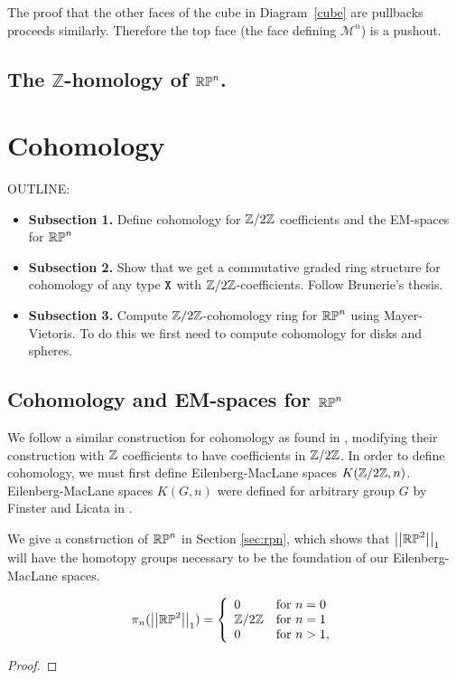 \documentclass{amsart}
\begin{document}
The proof that the other faces of the cube in Diagram~\ref{cube} are pullbacks proceeds similarly. Therefore the top face (the face defining $\mathcal{M}^n$) is a pushout. 



\subsection{The $\mathbb{Z}$-homology of $\mathbb{RP}^n$.}


\section{Cohomology}
\label{sec:cohom}

OUTLINE:
\begin{itemize}
\item 
  \textbf{Subsection 1.} 
  Define cohomology for $ \mathbb{Z}/2\mathbb{Z} $ coefficients and the
  EM-spaces for $ \mathbb{RP}^n $ 
\item
  \textbf{Subsection 2.} Show that we get a commutative
  graded ring structure for cohomology of any type $ \mathtt{X} $
  with $ \mathbb{Z}/2\mathbb{Z} $-coefficients. Follow Brunerie's thesis.
\item
  \textbf{Subsection 3.} Compute $ \mathbb{Z}/2\mathbb{Z} $-cohomology ring
  for $ \mathbb{RP}^n $ using Mayer-Vietoris.  To do this we 
  first need to compute cohomology for disks and spheres.  
\end{itemize}


\subsection{Cohomology and EM-spaces for $\mathbb{RP}^n$}


We follow a similar construction for cohomology as found in \cite{brunerie:thesis}, modifying their construction with $\mathbb{Z}$ coefficients to have coefficients in $\mathbb{Z}/2\mathbb{Z}$. In order to define cohomology, we must first define Eilenberg-MacLane spaces $K(\mathbb{Z}/2\mathbb{Z},n)$. Eilenberg-MacLane spaces $K(G,n)$ were defined for arbitrary group $G$ by Finster and Licata in \cite{fl:em}.

We give a construction of $\mathbb{RP}^n$ in Section \ref{sec:rpn}, which shows that $\left| \left| \mathbb{RP}^2\right| \right|_1$ will have the homotopy groups necessary to be the foundation of our Eilenberg-MacLane spaces. 
\begin{proposition}\label{prop:rpnhtpygps} %
	\[ \pi_n(\left| \left| \mathbb{RP}^2\right| \right|_1)=\left\{ \begin{array}{ll} 0 & \text{for }n=0\\
	\mathbb{Z}/2\mathbb{Z} & \text{for } n=1\\
	0 & \text{for } n> 1, 
	\end{array}\right.\]
\end{proposition}
\begin{proof}
\end{proof}
\end{document}
